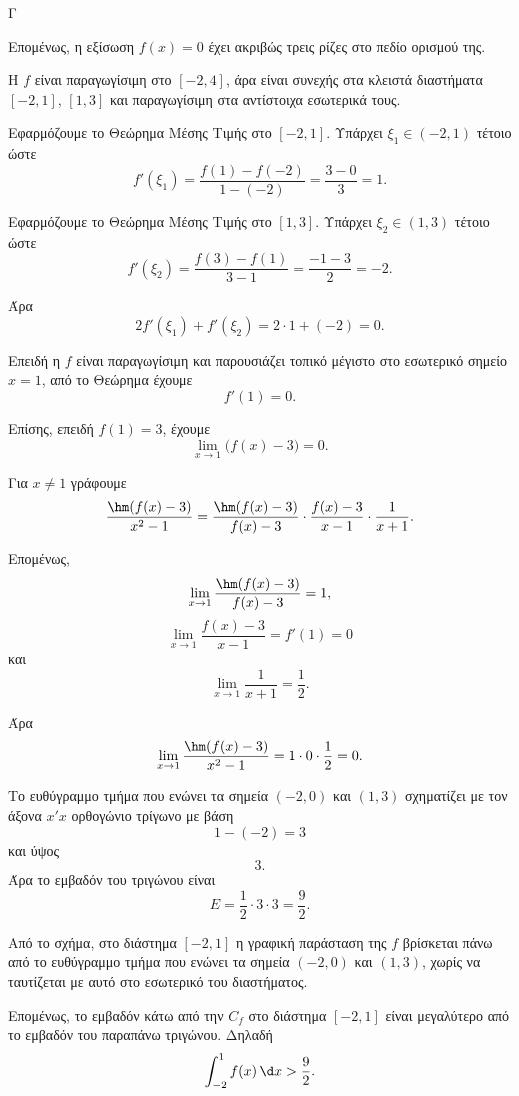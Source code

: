 \begin{thema}{Γ}
\begin{erwthma}
Επομένως, η εξίσωση $f(x)=0$ έχει ακριβώς τρεις ρίζες στο πεδίο ορισμού της.

\item Η $f$ είναι παραγωγίσιμη στο $[-2,4]$, άρα είναι συνεχής στα κλειστά διαστήματα $[-2,1]$, $[1,3]$ και παραγωγίσιμη στα αντίστοιχα εσωτερικά τους.

Εφαρμόζουμε το Θεώρημα Μέσης Τιμής στο $[-2,1]$. Υπάρχει $\xi_1\in(-2,1)$ τέτοιο ώστε
\[
f'(\xi_1)=\frac{f(1)-f(-2)}{1-(-2)}
=\frac{3-0}{3}=1.
\]

Εφαρμόζουμε το Θεώρημα Μέσης Τιμής στο $[1,3]$. Υπάρχει $\xi_2\in(1,3)$ τέτοιο ώστε
\[
f'(\xi_2)=\frac{f(3)-f(1)}{3-1}
=\frac{-1-3}{2}=-2.
\]

Άρα
\[
2f'(\xi_1)+f'(\xi_2)=2\cdot 1+(-2)=0.
\]

\item Επειδή η $f$ είναι παραγωγίσιμη και παρουσιάζει τοπικό μέγιστο στο εσωτερικό σημείο $x=1$, από το Θεώρημα  έχουμε
\[
f'(1)=0.
\]

Επίσης, επειδή $f(1)=3$, έχουμε
\[
\lim_{x\to 1}\bigl(f(x)-3\bigr)=0.
\]

Για $x\neq 1$ γράφουμε
\[
\frac{\hm(f(x)-3)}{x^2-1}
=
\frac{\hm(f(x)-3)}{f(x)-3}\cdot
\frac{f(x)-3}{x-1}\cdot
\frac{1}{x+1}.
\]

Επομένως,
\[
\lim_{x\to 1}\frac{\hm(f(x)-3)}{f(x)-3}=1,
\]
\[
\lim_{x\to 1}\frac{f(x)-3}{x-1}=f'(1)=0
\]
και
\[
\lim_{x\to 1}\frac{1}{x+1}=\frac{1}{2}.
\]

Άρα
\[
\lim_{x\to 1}\frac{\hm(f(x)-3)}{x^2-1}
=1\cdot 0\cdot \frac{1}{2}=0.
\]

\item Το ευθύγραμμο τμήμα που ενώνει τα σημεία $(-2,0)$ και $(1,3)$ σχηματίζει με τον άξονα $x'x$ ορθογώνιο τρίγωνο με βάση
\[
1-(-2)=3
\]
και ύψος
\[
3.
\]
Άρα το εμβαδόν του τριγώνου είναι
\[
E=\frac{1}{2}\cdot 3\cdot 3=\frac{9}{2}.
\]

Από το σχήμα, στο διάστημα $[-2,1]$ η γραφική παράσταση της $f$ βρίσκεται πάνω από το ευθύγραμμο τμήμα που ενώνει τα σημεία $(-2,0)$ και $(1,3)$, χωρίς να ταυτίζεται με αυτό στο εσωτερικό του διαστήματος.

Επομένως, το εμβαδόν κάτω από την $C_f$ στο διάστημα $[-2,1]$ είναι μεγαλύτερο από το εμβαδόν του παραπάνω τριγώνου. Δηλαδή
\[
\int_{-2}^1 f(x)\,\d x>\frac{9}{2}.
\]
\end{erwthma}
\end{thema}

